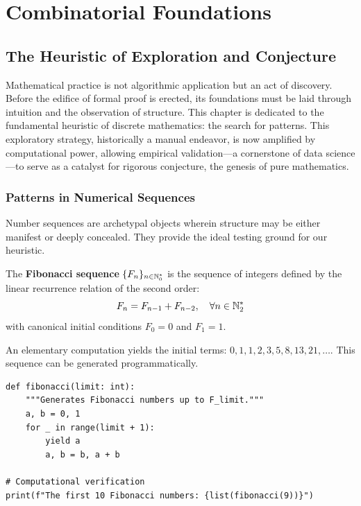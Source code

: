 \chapter{Combinatorial Foundations}

\section{The Heuristic of Exploration and Conjecture}

Mathematical practice is not algorithmic application but an act of discovery. Before the edifice of formal proof is erected, its foundations must be laid through intuition and the observation of structure. This chapter is dedicated to the fundamental heuristic of discrete mathematics: the search for patterns. This exploratory strategy, historically a manual endeavor, is now amplified by computational power, allowing empirical validation—a cornerstone of data science—to serve as a catalyst for rigorous conjecture, the genesis of pure mathematics.

\subsection{Patterns in Numerical Sequences}

Number sequences are archetypal objects wherein structure may be either manifest or deeply concealed. They provide the ideal testing ground for our heuristic.

\begin{definition}
The \textbf{Fibonacci sequence} $\{F_n\}_{n \in \mathbb{N}_{0}^*}$ is the sequence of integers defined by the linear recurrence relation of the second order:
$$F_n = F_{n-1} + F_{n-2}, \quad \forall n \in \mathbb{N}_{2}^*$$
with canonical initial conditions $F_0 = 0$ and $F_1 = 1$.
\end{definition}

An elementary computation yields the initial terms: $0, 1, 1, 2, 3, 5, 8, 13, 21, \dots$. This sequence can be generated programmatically.

\begin{verbatim}
def fibonacci(limit: int):
    """Generates Fibonacci numbers up to F_limit."""
    a, b = 0, 1
    for _ in range(limit + 1):
        yield a
        a, b = b, a + b

# Computational verification
print(f"The first 10 Fibonacci numbers: {list(fibonacci(9))}")
\end{verbatim}

